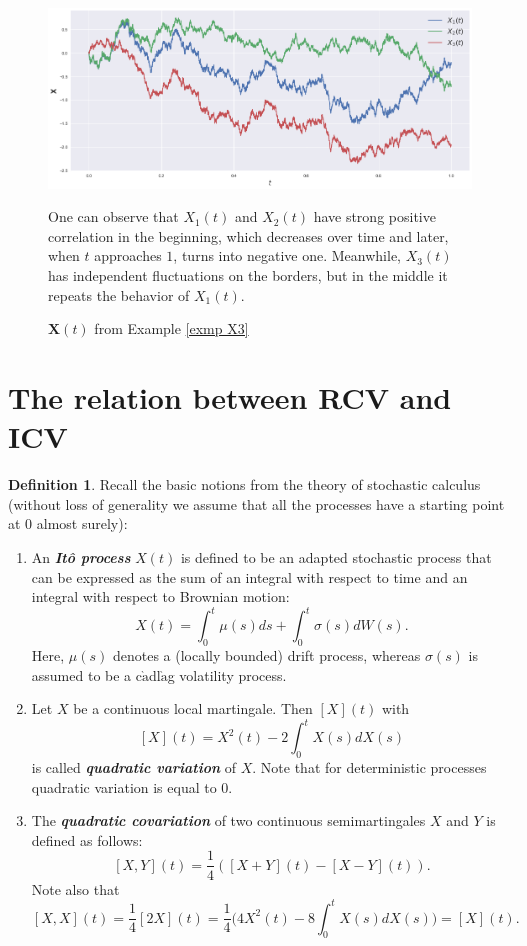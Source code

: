 \documentclass[a4paper,11pt]{book}
\theoremstyle{plain}
\theoremstyle{definition}
\newtheorem{defn}[thm]{Definition}
\newcommand{\define}[1]{\textit{\textbf{#1}}}
\begin{document}
	\begin{figure}
		\begin{center} \centering
			\includegraphics[scale=0.4]{X3}
			\caption{$\mathbf{X}(t)$ from Example \ref{exmp X3}}
			\smallskip
			\small
			One can observe that $X_1(t)$ and $X_2(t)$ have strong positive correlation in the beginning, which decreases over time and later, when $t$ approaches $1$, turns into negative one. Meanwhile, $X_3(t)$ has independent fluctuations on the borders, but in the middle it repeats the behavior of $X_1(t)$.
		\end{center}
	\end{figure}
	
	\section{The relation between RCV and ICV}
	
	\begin{defn} \label{stoch calc notions}
		Recall the basic notions from the theory of stochastic calculus (without loss of generality we assume that all the processes have a starting point at $0$ almost surely):
		\begin{enumerate}
			\item An \define{Itô process} $X(t)$ is defined to be an adapted stochastic process that can be expressed as the sum of an integral with respect to time and an integral with respect to Brownian motion:
			\[ X(t) = \int_{0}^{t} \mu(s) ds + \int_{0}^{t} \sigma(s) dW(s). \]
			Here, $\mu(s)$ denotes a (locally bounded) drift process, whereas $\sigma(s)$ is assumed to be a c$\grave{\text{a}}$dl$\grave{\text{a}}$g volatility process.
			\item Let $X$ be a continuous local martingale. Then $[X](t)$ with
			\[ [X](t) = X^2(t) - 2 \int_0^t X(s)dX(s) \]
			is called \define{quadratic variation} of $X$. Note that for deterministic processes quadratic variation is equal to $0$.
			\item The \define{quadratic covariation} of two continuous semimartingales $X$ and $Y$ is defined as follows:
			\[ [X, Y](t) = \frac{1}{4}([X + Y](t) - [X-Y](t)). \] 
			Note also that
			\[ [X, X](t) = \frac{1}{4}[2X](t) = \frac{1}{4} \big(4X^2(t)-8\int_{0}^{t}X(s)dX(s)\big) = [X](t). \]
		\end{enumerate}
	\end{defn}
	
\end{document}
